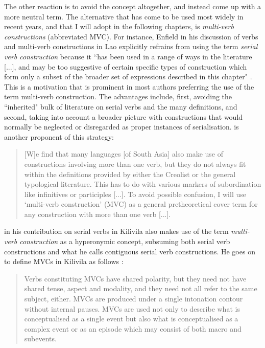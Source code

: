 The other reaction is to avoid the concept altogether, and instead come up with a more neutral term. The alternative that has come to be used most widely in recent years, and that I will adopt in the following chapters, is \textit{multi-verb constructions} (abbreviated MVC). For instance, Enfield in his discussion of verbs and multi-verb constructions in Lao explicitly refrains from using the term \textit{serial verb construction} because it ``has been used in a range of ways in the literature [...], and may be too suggestive of certain specific types of construction which form only a subset of the broader set of expressions described in this chapter" \citep[104, footnote 17]{enfield2008verbs}. This is a motivation that is prominent in most authors preferring the use of the term multi-verb construction. The advantages include, first, avoiding the ``inherited" bulk of literature on serial verbs and the many definitions, and second, taking into account a broader picture with constructions that would normally be neglected or disregarded as proper instances of serialisation. \citet[312]{nordhoff2012} is another proponent of this strategy:

\begin{quote}
[W]e find that many languages [of South Asia] also make use of constructions involving more than one verb, but they do not always fit within the definitions provided by either the Creolist or the general typological literature. This has to do with various markers of subordination like infinitives or participles [...]. To avoid possible confusion, I will use `multi-verb construction' (MVC) as a general pretheoretical cover term for any construction with more than one verb [...].
\end{quote}

\citet{senft2008event} in his contribution on serial verbs in Kilivila also makes use of the term \textit{multi-verb construction} as a hyperonymic concept, subsuming both serial verb constructions and what he calls contiguous serial verb constructions. He goes on to define MVCs in Kilivila as follows \citep[10]{senft2008event}: 

\begin{quote}Verbs constituting MVCs have shared polarity, but they need not have shared tense, aspect and modality, and they need not all refer to the same subject, either. MVCs are produced under a single intonation contour without internal pauses. MVCs are used not only to describe what is conceptualised as a single event but also what is conceptualised as a complex event or as an episode which may consist of both macro and subevents.\end{quote}

